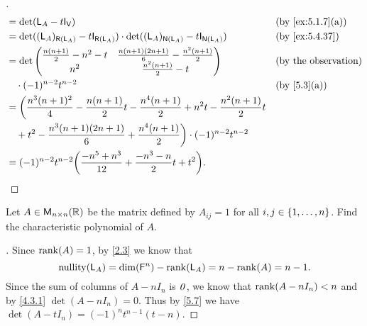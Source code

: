\begin{proof}[]
\begin{align*}
		 & = \det(\L_A - t \IT[\V])                                                                                         &  & \by{ex:5.1.7}[a] \\
		 & = \det((\L_A)_{\rg{\L_A}} - t \IT[\rg{\L_A}]) \cdot \det((\L_A)_{\ns{\L_A}} - t \IT[\ns{\L_A}])                  &  & \by{ex:5.4.37}   \\
		 & = \det\begin{pmatrix}
			         \frac{n(n + 1)}{2} - n^2 - t & \frac{n(n + 1)(2n + 1)}{6} - \frac{n^2 (n + 1)}{2} \\
			         n^2                          & \frac{n^2 (n + 1)}{2} - t
		         \end{pmatrix}                             &  & \text{(by the observation)}                                                \\
		 & \quad \cdot (-1)^{n - 2} t^{n - 2}                                                                               &  & \by{5.3}[a]      \\
		 & = \bigg(\frac{n^3 (n + 1)^2}{4} - \frac{n(n + 1)}{2} t - \frac{n^4 (n + 1)}{2} + n^2 t - \frac{n^2 (n + 1)}{2} t                       \\
		 & \quad + t^2 - \frac{n^3 (n + 1)(2n + 1)}{6} + \frac{n^4 (n + 1)}{2}\bigg) \cdot (-1)^{n - 2} t^{n - 2}                                 \\
		 & = (-1)^{n - 2} t^{n - 2} \pa{\frac{-n^5 + n^3}{12} + \frac{-n^3 - n}{2} t + t^2}.
	\end{align*}
\end{proof}

\begin{ex}\label{ex:5.4.42}
	Let \(A \in \ms[n][n][\R]\) be the matrix defined by \(A_{i j} = 1\) for all \(i, j \in \left\lbrace1, \dots, n\right\rbrace\).
	Find the characteristic polynomial of \(A\).
\end{ex}

\begin{proof}[]
	Since \(\rk{A} = 1\), by \cref{2.3} we know that
	\[
		\nt{\L_A} = \dim(\vs{F}^n) - \rk{\L_A} = n - \rk{A} = n - 1.
	\]
	Since the sum of columns of \(A - n I_n\) is \(\mathit{0}\), we know that \(\rk{A - n I_n} < n\) and by \cref{4.3.1} \(\det(A - n I_n) = 0\).
	Thus by \cref{5.7} we have \(\det(A - t I_n) = (-1)^n t^{n - 1} (t - n)\).
\end{proof}
